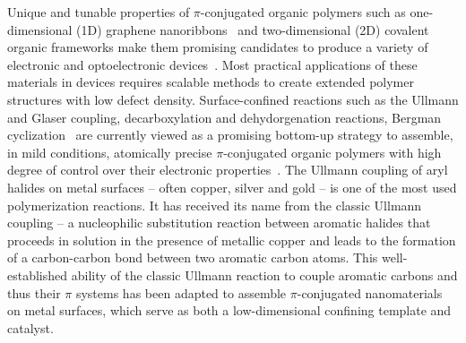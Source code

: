 \documentclass[%
 reprint,
 amsmath,amssymb,
 aps,
prb,
floatfix,
]{revtex4-2}
\newcommand{\lock}{\color{red}}
\newcommand{\lock}{\color{black}}
\newcommand{\comm}{\color{ForestGreen}} %
\begin{document}
{\lock


Unique and tunable properties of $\pi$-conjugated organic polymers such as one-dimensional (1D) graphene nanoribbons~\cite{ullmann_106, ullmann_45, ullmann_107, ullmann_101}
and two-dimensional (2D) covalent organic frameworks 
make them promising candidates to produce a variety of electronic and optoelectronic devices~\cite{ullmann_113, ullmann_114}.
%
Most practical applications of these materials in devices requires scalable methods to create extended polymer structures with low defect density.
%
Surface-confined reactions such as the Ullmann and Glaser coupling, decarboxylation and dehydorgenation reactions, Bergman cyclization~\cite{giovannantonio2018reversibility}
are currently viewed as a promising bottom-up strategy to assemble, in mild conditions, atomically precise $\pi$-conjugated organic polymers with high degree of control over their electronic properties~\cite{ullmann_33}. 
%
%
The Ullmann coupling of aryl halides on metal surfaces -- often copper, silver and gold -- is one of the most used polymerization reactions. It has received its name from the classic Ullmann coupling -- a nucleophilic substitution reaction between aromatic halides that proceeds in solution in the presence of metallic copper and leads to the formation of a carbon-carbon bond between two aromatic carbon atoms. 
This well-established ability of the classic Ullmann reaction to couple aromatic carbons and thus their $\pi$ systems has been adapted to assemble $\pi$-conjugated nanomaterials on metal surfaces, which serve as both a low-dimensional confining template and catalyst.

}
\end{document}
